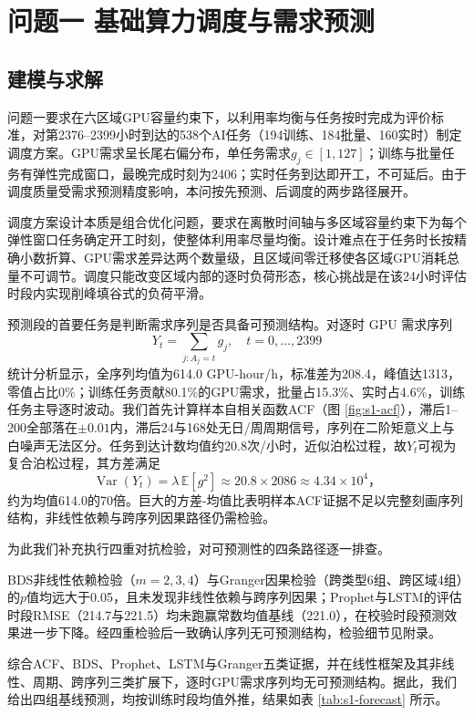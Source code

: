 \section{问题一 基础算力调度与需求预测}

\subsection{建模与求解}

问题一要求在六区域GPU容量约束下，以利用率均衡与任务按时完成为评价标准，对第2376--2399小时到达的538个AI任务（194训练、184批量、160实时）制定调度方案。GPU需求呈长尾右偏分布，单任务需求$g_j\in[1,127]$；训练与批量任务有弹性完成窗口，最晚完成时刻为2406；实时任务到达即开工，不可延后。由于调度质量受需求预测精度影响，本问按先预测、后调度的两步路径展开。

调度方案设计本质是组合优化问题，要求在离散时间轴与多区域容量约束下为每个弹性窗口任务确定开工时刻，使整体利用率尽量均衡。设计难点在于任务时长按精确小数折算、GPU需求差异达两个数量级，且区域间零迁移使各区域GPU消耗总量不可调节。调度只能改变区域内部的逐时负荷形态，核心挑战是在该24小时评估时段内实现削峰填谷式的负荷平滑。

预测段的首要任务是判断需求序列是否具备可预测结构。对逐时 GPU 需求序列
\[
Y_t = \sum_{j: A_j = t} g_j,\quad t = 0,\ldots,2399
\]
统计分析显示，全序列均值为614.0 GPU-hour/h，标准差为208.4，峰值达1313，零值占比0\%；训练任务贡献80.1\%的GPU需求，批量占15.3\%、实时占4.6\%，训练任务主导逐时波动。我们首先计算样本自相关函数ACF（图 \ref{fig:s1-acf}），滞后1--200全部落在$\pm0.01$内，滞后24与168处无日/周周期信号，序列在二阶矩意义上与白噪声无法区分。任务到达计数均值约20.8次/小时，近似泊松过程，故$Y_t$可视为复合泊松过程，其方差满足
\[
\operatorname{Var}(Y_t) = \lambda\,\mathbb{E}[g^2] \approx 20.8 \times 2086 \approx 4.34\times10^4\text{，}
\]
约为均值614.0的70倍。巨大的方差-均值比表明样本ACF证据不足以完整刻画序列结构，非线性依赖与跨序列因果路径仍需检验。

为此我们补充执行四重对抗检验，对可预测性的四条路径逐一排查。

BDS非线性依赖检验（$m=2,3,4$）与Granger因果检验（跨类型6组、跨区域4组）的$p$值均远大于0.05，且未发现非线性依赖与跨序列因果；Prophet与LSTM的评估时段RMSE（214.7与221.5）均未跑赢常数均值基线（221.0），在校验时段预测效果进一步下降。经四重检验后一致确认序列无可预测结构，检验细节见附录。

综合ACF、BDS、Prophet、LSTM与Granger五类证据，并在线性框架及其非线性、周期、跨序列三类扩展下，逐时GPU需求序列均无可预测结构。据此，我们给出四组基线预测，均按训练时段均值外推，结果如表 \ref{tab:s1-forecast} 所示。

